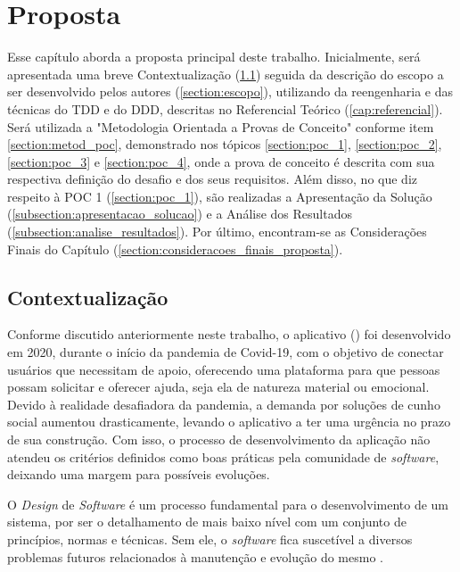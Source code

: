 \chapter[Proposta]{Proposta}
\label{cap:proposta}

Esse capítulo aborda a proposta principal deste trabalho. Inicialmente, será apresentada uma breve 
Contextualização (\ref{section:proposta_context}) seguida da descrição do escopo a ser desenvolvido 
pelos autores (\ref{section:escopo}), utilizando da reengenharia e das técnicas do TDD e do DDD, descritas 
no Referencial Teórico (\ref{cap:referencial}). Será utilizada a "Metodologia Orientada a Provas de 
Conceito" conforme item \ref{section:metod_poc}, demonstrado nos tópicos \ref{section:poc_1}, 
\ref{section:poc_2}, \ref{section:poc_3} e \ref{section:poc_4}, onde a prova de 
conceito é descrita com sua respectiva definição do desafio e dos seus requisitos. Além disso, no que diz respeito à 
POC 1 (\ref{section:poc_1}), são realizadas a Apresentação da Solução (\ref{subsection:apresentacao_solucao}) 
e a Análise dos Resultados (\ref{subsection:analise_resultados}). Por último, encontram-se as Considerações 
Finais do Capítulo (\ref{section:consideracoes_finais_proposta}).

\section{Contextualização}
\label{section:proposta_context}

Conforme discutido anteriormente neste trabalho, o aplicativo  (\citeyear{MiaAjuda}) foi desenvolvido em 2020, 
durante o início da pandemia de Covid-19, com o objetivo de conectar usuários que necessitam de apoio, 
oferecendo uma plataforma para que pessoas possam solicitar e oferecer ajuda, seja ela de natureza material 
ou emocional. Devido à realidade desafiadora da pandemia, a demanda por soluções de cunho social aumentou 
drasticamente, levando o aplicativo a ter uma urgência no prazo de sua construção. Com isso, o processo de 
desenvolvimento da aplicação não atendeu os critérios definidos como boas práticas pela comunidade de 
\textit{software}, deixando uma margem para possíveis evoluções.

O \textit{Design} de \textit{Software} é um processo fundamental para o desenvolvimento de um sistema, 
por ser o detalhamento de mais baixo nível com um conjunto de princípios, normas e técnicas. Sem 
ele, o \textit{software} fica suscetível a diversos problemas futuros relacionados à manutenção e 
evolução do mesmo \cite{robert2019clean}.

